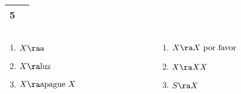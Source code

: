 {\begin{footnotesize}
\begin{tabular}{| c | p{1.55cm}  p{1.55cm}  p{1.55cm}  p{1.55cm}  p{1.55cm} |}
	   5 & \multicolumn{5}{c|}{\only<14->{\cellcolor{red!10}$S_{0,5} \ara{6} X_{0,5}$}} \\ \hline   
	
	\end{tabular}
	\end{footnotesize}
	
	\begin{columns}
		\begin{column}{6cm}
			\begin{enumerate}
				\item \alert<2>{$X \ra \text{a}$}
				\item \alert<3>{$X \ra \text{luz}$}
				\item \alert<5,7,12>{$X \ra \text{apague } X$}
				\saveenum
			\end{enumerate}
		\end{column}
		\begin{column}{6cm}
			\begin{enumerate}
				\resume
				\item \alert<6,9,13>{$X \ra X \text{ por favor}$}
				\item \alert<4,8,10,11>{$X \ra X X$}
				\item \alert<14>{$S \ra X$}
			\end{enumerate}
		\end{column}
	\end{columns}
}

